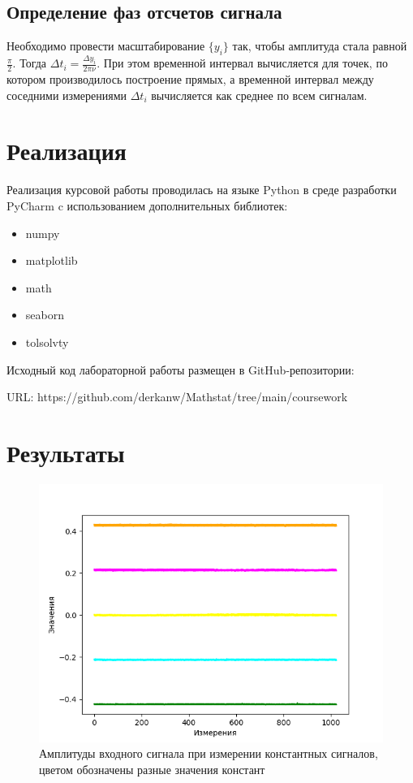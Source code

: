 \documentclass[12pt,a4paper]{article}
\begin{document}
\subsection{Определение фаз отсчетов сигнала}
Необходимо провести масштабирование $\{y_i\}$ так, чтобы амплитуда стала равной $\frac{\pi}{2}$. Тогда $\Delta{t_i}=\frac{\Delta{y_i}}{2\pi\nu}$. При этом временной интервал вычисляется для точек, по котором производилось построение прямых, а временной интервал между соседними измерениями $\Delta{t_i}$ вычисляется как среднее по всем сигналам.

\section{Реализация}
Реализация курсовой работы проводилась на языке Python в среде разработки PyCharm c использованием дополнительных библиотек:
\begin{itemize}
    \item numpy
    \item matplotlib
    \item math
    \item seaborn
    \item tolsolvty
\end{itemize}

Исходный код лабораторной работы размещен в GitHub-репозитории:

URL: https://github.com/derkanw/Mathstat/tree/main/coursework

\section{Результаты}
\begin{figure}[H]
    \centering
    \includegraphics[scale=0.8]{images/levels.png}
    \caption{Амплитуды входного сигнала при измерении константных сигналов, цветом обозначены разные значения констант}
\end{figure}
\end{document}
